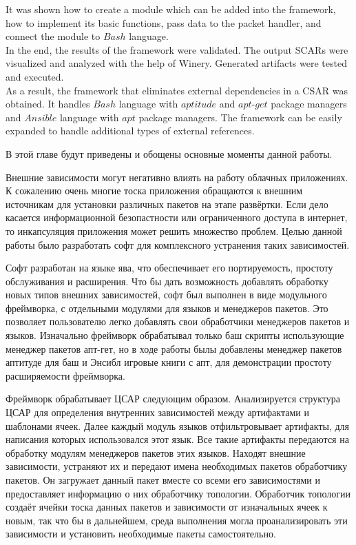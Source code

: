It  was shown how to create a module which can be added into the framework, how to implement its basic functions, pass data to the packet handler, and connect the module to $Bash$ language. \\
In the end, the results of the framework were validated.
The output SCARs were visualized and analyzed with the help of Winery.
Generated artifacts were tested and executed.\\
As a result, the framework that eliminates external dependencies in a CSAR was obtained.
It handles $Bash$ language with $aptitude$ and $apt$-$get$ package managers and $Ansible$ language with $apt$ package managers.
The framework can be easily expanded to handle additional types of external references. 

В этой главе будут приведены и обощены основные моменты данной работы.

Внешние зависимости могут негативно влиять на работу облачных приложениях.
К сожалению очень многие тоска приложения обращаются к внешним источникам для установки различных пакетов на этапе развёртки.
Если дело касается информационной безопастности или ограниченного доступа в интернет, то инкапсуляция приложения может решить множество проблем.
Целью данной работы было разработать софт для комплексного устранения таких зависимостей.

Софт разработан на языке ява, что обеспечивает его портируемость, простоту обслуживания и расширения.
Что бы дать возможность добавлять обработку новых типов внешних зависимостей, софт был выполнен в виде модульного фреймворка, с отдельными модулями для языков и менеджеров пакетов.
Это позволяет пользователю легко добавлять свои обработчики менеджеров пакетов и языков.
Изначально фреймворк обрабатывал только баш скрипты использующие менеджер пакетов апт-гет, но в ходе работы былы добавлены менеджер пакетов аптитуде для баш и Энсибл игровые книги с апт, для демонстрации простоту расширяемости фреймворка. 

Фреймворк обрабатывает ЦСАР следующим образом. 
Анализируется структура ЦСАР для определения внутренних зависимостей между артифактами и шаблонами ячеек.
Далее каждый модуль языков отфильтровывает артифакты, для написания которых использовался этот язык.
Все такие артифакты передаются на обработку модулям менеджеров пакетов этих языков. 
Находят внешние зависимости, устраняют их и передают имена необходимых пакетов обработчику пакетов.
Он загружает данный пакет вместе со всеми его зависимостями и предоставляет информацию о них обработчику топологии.
Обработчик топологии создаёт ячейки тоска данных пакетов и зависимости от изначальных ячеек к новым, так что бы в дальнейшем, среда выполнения могла проанализировать эти зависимости и установить необходимые пакеты самостоятельно.

